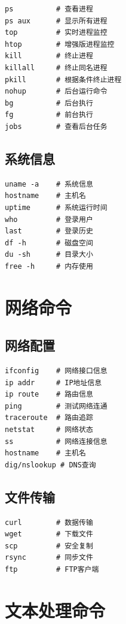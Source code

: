 \documentclass[12pt,UTF8]{ctexbook}
\begin{document}
\begin{verbatim}
ps          # 查看进程
ps aux      # 显示所有进程
top         # 实时进程监控
htop        # 增强版进程监控
kill        # 终止进程
killall     # 终止同名进程
pkill       # 根据条件终止进程
nohup       # 后台运行命令
bg          # 后台执行
fg          # 前台执行
jobs        # 查看后台任务
\end{verbatim}

\subsection*{系统信息}

\begin{verbatim}
uname -a    # 系统信息
hostname    # 主机名
uptime      # 系统运行时间
who         # 登录用户
last        # 登录历史
df -h       # 磁盘空间
du -sh      # 目录大小
free -h     # 内存使用
\end{verbatim}

\section{网络命令}
\label{sec:network-commands}

\subsection*{网络配置}

\begin{verbatim}
ifconfig    # 网络接口信息
ip addr     # IP地址信息
ip route    # 路由信息
ping        # 测试网络连通
traceroute  # 路由追踪
netstat     # 网络状态
ss          # 网络连接信息
hostname    # 主机名
dig/nslookup # DNS查询
\end{verbatim}

\subsection*{文件传输}

\begin{verbatim}
curl        # 数据传输
wget        # 下载文件
scp         # 安全复制
rsync       # 同步文件
ftp         # FTP客户端
\end{verbatim}

\section{文本处理命令}
\label{sec:text-commands}
\end{document}
